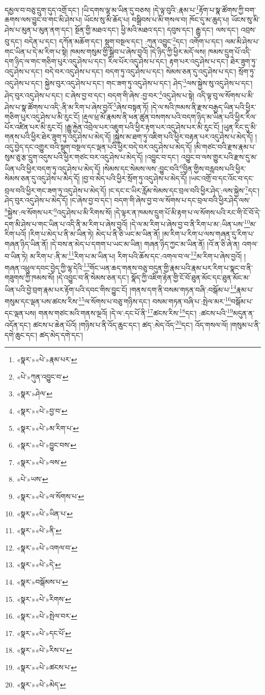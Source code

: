 དམྱལ་བ་བཅུ་དྲུག་དུད་འགྲོ་དང་། །ཡི་དགས་ལྷ་མ་ཡིན་དུ་བཅས། །དེ་ལྟ་བུའི་:རྣམ་པ་\footnote{«སྣར་»«པེ་»རྣམ་པར་}རྟོག་པ་སྣ་ཚོགས་ཀྱི་བག་ཆགས་ལས་བྱུང་བ་གང་མི་ཤེས་པ། ཡོངས་སུ་མི་ཆོད་པ། བསྒྲིབས་པ་མི་གསལ་བ། ཁོང་དུ་མ་ཆུད་པ། ཡོངས་སུ་མི་ཤེས་པ་མུན་པ་མུན་ནག་དང་། སྔོན་གྱི་མཐའ་དང་། ཕྱི་མའི་མཐའ་དང་། དབུས་དང་། རྒྱུ་དང་། ལས་དང་། འབྲས་བུ་དང་། བདེན་པ་དང་། དཀོན་མཆོག་དང་། སྡུག་བསྔལ་དང་། :ཀུན་འབྱུང་\footnote{«པེ་»ཀུན་འབྱུང་བ་}དང་། འགོག་པ་དང་། ལམ་མི་ཤེས་པ་གང་ཡིན་པ་དེ་མ་རིག་པ་སྟེ། ཁམས་གསུམ་གྱི་སྒྲིབ་པ་ཞེས་བྱའོ། །དེ་ཉིད་ཀྱི་ཕྱིར་མདོ་ལས། ཁམས་དྲུག་པོ་འདི་དག་ཉིད་ལ་གང་གཅིག་པུར་འདུ་ཤེས་པ་དང་། རིལ་པོར་འདུ་ཤེས་པ་དང་། རྟག་པར་འདུ་ཤེས་པ་དང་། ཐེར་ཟུག་ཏུ་འདུ་ཤེས་པ་དང་། བདེ་བར་འདུ་ཤེས་པ་དང་། བདག་ཏུ་འདུ་ཤེས་པ་དང་། སེམས་ཅན་དུ་འདུ་ཤེས་པ་དང་། སྲོག་ཏུ་འདུ་ཤེས་པ་དང་། སྐྱེས་བུར་འདུ་ཤེས་པ་དང་། གང་ཟག་ཏུ་འདུ་ཤེས་པ་དང་། ཤེད་\footnote{«སྣར་»ཤེལ་}ལས་སྐྱེས་སུ་འདུ་ཤེས་པ་དང་། ཤེད་བུར་འདུ་ཤེས་པ་དང་། ང་ཞེས་བྱ་བ་དང་། བདག་གི་ཞེས་:བྱ་བར་\footnote{«སྣར་»«པེ་»བྱ་བ་}འདུ་ཤེས་པ་སྟེ། འདི་ལྟ་བུ་ལ་སོགས་པ་མི་ཤེས་པ་སྣ་ཚོགས་པ་འདི་:ནི་མ་རིག་པ་ཞེས་བྱའོ་\footnote{«སྣར་»«པེ་»མ་རིག་པ་}ཞེས་བསྟན་ཏོ། །དེ་ལ་སའི་ཁམས་ནི་རྫས་བརྒྱད་ཡིན་པའི་ཕྱིར་གཅིག་པུར་འདུ་ཤེས་པ་མི་རུང་ངོ། །རྡུལ་ཕྲ་མོ་རྣམས་ནི་ཕན་ཚུན་བསགས་པའི་བདག་ཉིད་མ་ཡིན་པའི་ཕྱིར་རིལ་པོར་འཛིན་པར་མི་རུང་ངོ། །རྒྱུ་རྐྱེན་འབྲེལ་པར་འཇུག་པའི་ཕྱིར་རྟག་པར་འདུ་ཤེས་པར་མི་རུང་ངོ། །ཡུན་རིང་དུ་མི་གནས་པའི་ཕྱིར་ཐེར་ཟུག་ཏུ་འདུ་ཤེས་པ་མེད་དོ། །སྐྱེས་མ་ཐག་ཏུ་འཇིག་པའི་ཕྱིར་བརྟན་པར་འདུ་ཤེས་པ་མེད་དོ། །འདུ་བྱེད་དང་འགྱུར་བའི་སྡུག་བསྔལ་དང་ལྡན་པའི་ཕྱིར་བདེ་བར་འདུ་ཤེས་པ་མེད་དོ། །མི་གཙང་བའི་རྫས་རྣམ་པ་སུམ་ཅུ་རྩ་དྲུག་འདུས་པའི་ཕྱིར་གཙང་བར་འདུ་ཤེས་པ་མེད་དོ། །འབྱུང་བ་དང་། འབྱུང་བ་ལས་གྱུར་པའི་རྫས་དུ་མ་ཡིན་པའི་ཕྱིར་བདག་ཏུ་འདུ་ཤེས་པ་མེད་དོ། །སེམས་དང་སེམས་ལས་:བྱུང་བའི་\footnote{«སྣར་»«པེ་»བྱུང་བས་}བྱིན་གྱིས་བརླབས་པའི་ཕྱིར་སེམས་ཅན་དུ་འདུ་ཤེས་པ་མེད་དོ། །བྱ་བ་མེད་པའི་ཕྱིར་སྲོག་ཏུ་འདུ་ཤེས་པ་མེད་དོ། །ཡང་འགྲོ་བ་དང་འོང་བ་དང་བྲལ་བའི་ཕྱིར་གང་ཟག་ཏུ་འདུ་ཤེས་པ་མེད་དོ། །ང་དང་ང་ཡིར་རློམ་སེམས་དང་བྲལ་བའི་ཕྱིར་ཤེད་:ལས་སྐྱེས་\footnote{«སྣར་»«པེ་»ལས་}དང་། ཤེད་བུར་འདུ་ཤེས་པ་མེད་དོ། །ང་ཞེས་བྱ་བ་དང་། བདག་གི་ཞེས་བྱ་བ་ལ་སོགས་པ་དང་བྲལ་བའི་ཕྱིར་ཤེད་ལས་\footnote{«པེ་»ཡས་}སྐྱེས་:ལ་སོགས་པར་\footnote{«སྣར་»«པེ་»ལ་སོགས་པ་}འདུ་ཤེས་པ་མི་རིགས་སོ། །དེ་ལྟར་ན་ཁམས་དྲུག་པོ་མི་རྟག་པ་ལ་སོགས་པའི་རང་གི་ངོ་བོ་དེ་དག་མི་ཤེས་པ་གང་ཡིན་པ་འདི་ནི་མ་རིག་པ་ཞེས་བྱའོ། །དེ་ལ་མ་རིག་པ་ཞེས་བྱ་བ་ནི་རིག་པ་མ་:ཡིན་པས་\footnote{«སྣར་»«པེ་»ཡིན་པ་}མ་རིག་པའོ། །རིག་པ་མེད་པ་ནི་མ་ཡིན་ཏེ། མེད་པ་ནི་ཅི་ཡང་མ་ཡིན་ནོ། །མ་རིག་པ་རིག་པ་ལས་གཞན་དུ་རིག་པ་གཞན་ཉིད་ཡིན་ནོ། །དེ་བས་ན་མེད་པ་དགག་པ་ཡང་མ་ཡིན། གཞན་ཉིད་ཀྱང་མ་ཡིན་ནོ། །འོ་ན་ཅི་ཞེ་ན། འགལ་བ་ཡིན་ཏེ། མ་རིག་པ་:ནི་མ་\footnote{«སྣར་»«པེ་»ནི་}རིག་པ་མ་ཡིན་པ། རིག་པའི་ཆོས་དང་:འགལ་བ་ལ་\footnote{«སྣར་»«པེ་»འགལ་བ་}མ་རིག་པ་ཞེས་བྱའོ། །གཞན་འཕྲུལ་དབང་བྱེད་ཀྱི་ལྷ་དེའི་\footnote{«སྣར་»«པེ་»དེ་}གོང་ཡན་ཆད་གནས་བཅུ་བདུན་གྱི་རྣམ་པའི་རྣམ་པར་རིག་པ་སྣང་བ་ནི་གཟུགས་ཀྱི་ཁམས་སོ། །དེ་འབྱུང་བ་ནི་སེམས་ཅན་དང་། སྣོད་ཀྱི་འཇིག་རྟེན་གྱི་ངོ་བོ་ཐུན་མོང་དང་ཐུན་མོང་མ་ཡིན་པའི་བྱེ་བྲག་རྣམ་པར་རྟོག་པའི་དབང་གིས་བྱུང་ངོ། །གནས་དག་ནི་བསམ་གཏན་བཞི་:བསྒོམ་པ་\footnote{«སྣར་»བསྒོམས་པ་}རྣམ་པ་གསུམ་དང་ལྡན་པས་ཚངས་རིས་\footnote{«སྣར་»«པེ་»རིགས་}ལ་སོགས་པ་བཅུ་གཉིས་དང་། བསམ་གཏན་བཞི་པ་:སྤེལ་མར་\footnote{«སྣར་»«པེ་»སྤེལ་བར་}བསྒོམ་པ་དང་ལྡན་པས། གནས་གཙང་མའི་གནས་ལྔའོ། །དེ་ལ་:དང་པོ་ནི་\footnote{«སྣར་»«པེ་»དང་པོ་}ཚངས་རིས་\footnote{«སྣར་»«པེ་»རིས་པ་}དང་། :ཚངས་པའི་\footnote{«སྣར་»«པེ་»ཚངས་པ་}མདུན་ན་འདོན་དང་། ཚངས་པ་ཆེན་པོའོ། །གཉིས་པ་ནི་འོད་ཆུང་དང་། ཚད་:མེད་འོད་\footnote{«སྣར་»«པེ་»མེད་}དང་། འོད་གསལ་ལོ། །གསུམ་པ་ནི་དགེ་ཆུང་དང་། ཚད་མེད་དགེ་དང་། 